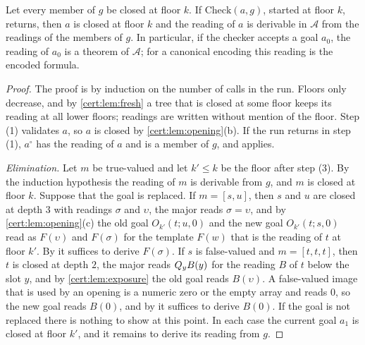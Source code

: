 \begin{theorem}\label{cert:thm:base-sound}
Let every member of $g$ be closed at floor $k$. If $\mathrm{Check}(a,g)$,
started at floor $k$, returns, then $a$ is closed at floor $k$ and the reading
of $a$ is derivable in $\mathcal A$ from the readings of the members of $g$.
In particular, if the checker accepts a goal $a_0$, the reading of $a_0$ is a
theorem of $\mathcal A$; for a canonical encoding this reading is the encoded
formula.
\end{theorem}
\begin{proof}
The proof is by induction on the number of calls in the run. Floors only
decrease, and by \cref{cert:lem:fresh} a tree that is closed at some floor
keeps its reading at all lower floors; readings are written without mention of
the floor. Step (1) validates $a$, so $a$ is closed by
\cref{cert:lem:opening}(b). If the run returns in step (1), $a^{\circ}$ has the
reading of $a$ and is a member of $g$, and  applies.

\emph{Elimination.} Let $m$ be true-valued and let $k'\le k$ be the floor
after step (3). By the induction hypothesis the reading of $m$ is derivable
from $g$, and $m$ is closed at floor $k$. Suppose that the goal is replaced.
If $m=[s,u]$, then $s$ and $u$ are closed at depth $3$ with readings $\sigma$
and $\upsilon$, the major reads $\sigma=\upsilon$, and by
\cref{cert:lem:opening}(c) the old goal $O_{k'}(t;u,0)$ and the new goal
$O_{k'}(t;s,0)$ read as $F(\upsilon)$ and $F(\sigma)$ for the template $F(w)$
that is the reading of $t$ at floor $k'$. By  it suffices to
derive $F(\sigma)$. If $s$ is false-valued and $m=[t,t,t]$, then $t$ is closed
at depth $2$, the major reads $Q_{y}B(y)$ for the reading $B$ of $t$ below the
slot $y$, and by \cref{cert:lem:exposure} the old goal reads $B(\upsilon)$. A
false-valued image that is used by an opening is a numeric zero or the empty
array and reads $0$, so the new goal reads $B(0)$, and by  it
suffices to derive $B(0)$. If the goal is not replaced there is nothing to
show at this point. In each case the current goal $a_1$ is closed at floor
$k'$, and it remains to derive its reading from $g$.


\end{proof}
